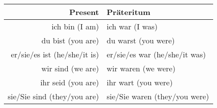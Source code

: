 \begin{itemize}
  \begin{center}\begin{tabular}{r|l}
    \textbf{Present} & \textbf{Pr{\"a}teritum} \\
    \hline
    ich bin (I am) & ich war (I was) \\
    du bist (you are) & du warst (you were) \\
    er/sie/es ist (he/she/it is) & er/sie/es war (he/she/it was) \\
    wir sind (we are) & wir waren (we were) \\
    ihr seid (you are) & ihr wart (you were) \\
    sie/Sie sind (they/you are) & sie/Sie waren (they/you were) \\
  \end{tabular}\end{center}
\end{itemize}

